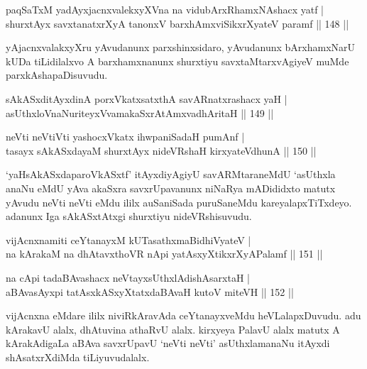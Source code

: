 \begin{shl}
paqSaTxM yadAyxjacnxvalekxyXVna na vidubArxRhamxNAshacx yatf |\\
shurxtAyx savxtanatxrXyA tanonxV barxhAmx\s \s viSikxrXyateV paramf \hfill || 148 ||
\end{shl}

\begin{artha}%
yAjacnxvalakxyXru yAvudanunx parxshinxsidaro, yAvudanunx bArxhamxNarU kUDa tiLidilalxvo A barxhamxnanunx shurxtiyu savxtaMtarxvAgiyeV muMde parxkAshapaDisuvudu.
\end{artha}

\begin{shl}
sAkASxditAyxdinA porxVkatxsatxthA savARnatxrashacx yaH |\\
asUthxloV\s naNuriteyxVvamakaSxrAtAmx\s vadhAritaH \hfill || 149 ||
\end{shl}

\begin{shl}
neVti neVtiVti yashocxVkatx ihwpaniSadaH pumAnf |\\
tasayx sAkASxdayaM shurxtAyx nideVRshaH kirxyateV\s dhunA \hfill || 150 ||
\end{shl}

\begin{artha}
`yaHsAkASxdaparoVkASxtf' itAyxdiyAgiyU savARMtaraneMdU `asUthxla anaNu eMdU yAva akaSxra savxrUpavanunx niNaRya mADididxto matutx yAvudu neVti neVti eMdu ililx auSaniSada puruSaneMdu kareyalapxTiTxdeyo. adanunx Iga sAkASxtAtxgi shurxtiyu nideVRshisuvudu.
\end{artha}

\begin{shl}
vijAcnxnamiti ceYtanayxM kUTasathxmaBidhiVyateV |\\
na kArakaM na dhAtavxthoVR nApi yatAsxyXtikxrXyAPalamf \hfill || 151 ||
\end{shl}

\begin{shl}
na cApi tadaBAvashacx neVtayxsUthxlAdishAsarxtaH |\\
aBAvasAyxpi tatAsxkASxyXtatxdaBAvaH kutoV miteVH \hfill || 152 ||
\end{shl}

\begin{artha}
vijAcnxna eMdare ililx niviRkAravAda ceYtanayxveMdu heVLalapxDuvudu. adu kArakavU alalx, dhAtuvina athaRvU alalx. kirxyeya PalavU alalx matutx A kArakAdigaLa aBAva savxrUpavU `neVti neVti' asUthxlamanaNu itAyxdi shAsatxrXdiMda tiLiyuvudalalx.
\end{artha}

